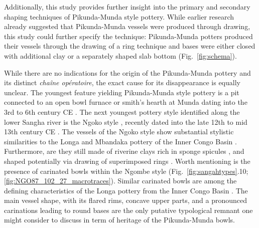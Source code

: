\documentclass[smallextended,natbib]{svjour3}       %
\begin{document}
Additionally, this study provides further insight into the primary and secondary shaping techniques of Pikunda-Munda style pottery. While earlier research \citep[47--51 Fig.~13,69--73]{Seidensticker.2021e} already suggested that Pikunda-Munda vessels were produced through drawing, this study could further specify the technique: Pikunda-Munda potters produced their vessels through the drawing of a ring technique and bases were either closed with additional clay or a separately shaped slab bottom (Fig.~\ref{fig:schema}).


While there are no indications for the origin of the Pikunda-Munda pottery and its distinct \textit{chaîne opératoire}, the exact cause for its disappearance is equally unclear. The youngest feature yielding Pikunda-Munda style pottery is a pit connected to an open bowl furnace or smith's hearth at Munda dating into the 3rd to 6th century CE \citep[335--339 Fig.~170]{Seidensticker.2021e}. The next youngest pottery style identified along the lower Sangha river is the Ngoko style \citep[Fig.~\ref{fig:timeslicemaps};][125--128]{Seidensticker.2021e}, recently dated into the late 12th to mid 13th century CE \citep[Tab.~2: RICH-30864]{Seidensticker.2024}. The vessels of the Ngoko style show substantial stylistic similarities to the Longa and Mbandaka pottery of the Inner Congo Basin \citep[121--128,139--143]{Wotzka.1995}. Furthermore, are they still made of riverine clays rich in sponge spicules \citep{Seidensticker.2020}, and shaped potentially via drawing of superimposed rings \citep[Fig.~\ref{fig:NGO87_102_27_macrotraces}--\ref{fig:NGO87_102_28-29_macrotraces};][52--53 Fig.~15]{Seidensticker.2021e}. Worth mentioning is the presence of carinated bowls within the Ngombe style (Fig.~\ref{fig:sangahtypes}.10; \ref{fig:NGO87_102_27_macrotraces}). Similar carinated bowls are among the defining characteristics of the Longa pottery from the Inner Congo Basin \citep[121--128]{Wotzka.1995}. The main vessel shape, with its flared rims, concave upper parts, and a pronounced carinations leading to round bases \citep[197 Fig.~94.1--2]{Seidensticker.2021e} are the only putative typological remnant one might consider to discuss in term of heritage of the Pikunda-Munda bowls.
\end{document}
